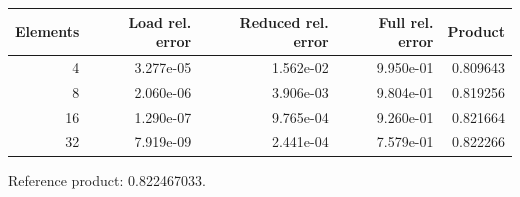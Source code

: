\begin{center}\small
\begin{tabular}{rrrrr}\toprule
Elements & Load rel. error & Reduced rel. error & Full rel. error & Product\\\midrule
4 & 3.277e-05 & 1.562e-02 & 9.950e-01 & 0.809643\\
8 & 2.060e-06 & 3.906e-03 & 9.804e-01 & 0.819256\\
16 & 1.290e-07 & 9.765e-04 & 9.260e-01 & 0.821664\\
32 & 7.919e-09 & 2.441e-04 & 7.579e-01 & 0.822266\\
\bottomrule\end{tabular}
\par Reference product: 0.822467033.
\end{center}

